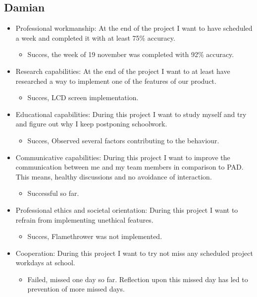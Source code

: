\documentclass[12pt]{article}
\begin{document}
	\subsection{Damian}
	\begin{itemize}
		\item Professional workmanship: At the end of the project I want to have scheduled a week and completed it with at least 75\% accuracy.
		\begin{itemize}
			\item Succes, the week of 19 november was completed with 92\% accuracy.
		\end{itemize}
		\item Research capabilities: At the end of the project I want to at least have researched a way to implement one of the features of our product.
		\begin{itemize}
			\item Succes, LCD screen implementation. 
		\end{itemize}
		\item Educational capabilities: During this project I want to study myself and try and figure out why I keep postponing schoolwork.
		\begin{itemize}
			\item Succes, Observed several factors contributing to the behaviour. 
		\end{itemize}
		\item Communicative capabilities: During this project I want to improve the communication between me and my team members in comparison to PAD. This means, healthy discussions and no avoidance of interaction.
		\begin{itemize}
			\item Successful so far.
		\end{itemize}
		\item Professional ethics and societal orientation: During this project I want to refrain from implementing unethical features.
		\begin{itemize}
			\item Succes, Flamethrower was not implemented.
		\end{itemize}
		\item Cooperation: During this project I want to try not miss any scheduled project workdays at school.
		\begin{itemize}
			\item Failed, missed one day so far. Reflection upon this missed day has led to prevention of more missed days.
		\end{itemize}
	\end{itemize}
\end{document}

